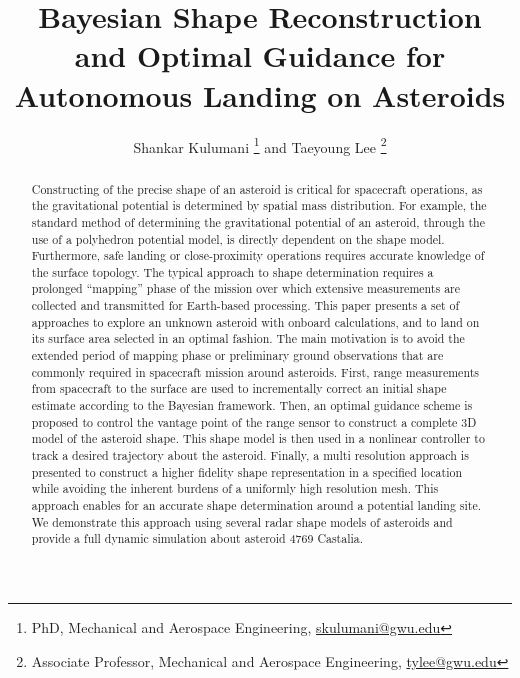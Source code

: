 \documentclass[journal]{new-aiaa}
\title{Bayesian Shape Reconstruction and Optimal Guidance for Autonomous Landing on Asteroids}
\author{Shankar Kulumani \footnote{PhD, Mechanical and Aerospace Engineering, \href{mailto:skulumani@gwu.edu}{skulumani@gwu.edu}}
and
Taeyoung Lee \footnote{Associate Professor, Mechanical and Aerospace Engineering, \href{mailto:tylee@gwu.edu}{tylee@gwu.edu}}}
\affil{The George Washington University, Washington, DC, 20052}
\begin{document}
\maketitle

\begin{abstract}
    Constructing of the precise shape of an asteroid is critical for spacecraft operations, as the gravitational potential is determined by spatial mass distribution.
    For example, the standard method of determining the gravitational potential of an asteroid, through the use of a polyhedron potential model, is directly dependent on the shape model.
    Furthermore, safe landing or close-proximity operations requires accurate knowledge of the surface topology. 
    The typical approach to shape determination requires a prolonged ``mapping'' phase of the mission over which extensive measurements are collected and transmitted for Earth-based processing.
    This paper presents a set of approaches to explore an unknown asteroid with onboard calculations, and to land on its surface area selected in an optimal fashion. 
    The main motivation is to avoid the extended period of mapping phase or preliminary ground observations that are commonly required in spacecraft mission around asteroids. 
    First, range measurements from spacecraft to the surface are used to incrementally correct an initial shape estimate according to the Bayesian framework. 
    Then, an optimal guidance scheme is proposed to control the vantage point of the range sensor to construct a complete 3D model of the asteroid shape. 
    This shape model is then used in a nonlinear controller to track a desired trajectory about the asteroid.
    Finally, a multi resolution approach is presented to construct a higher fidelity shape representation in a specified location while avoiding the inherent burdens of a uniformly high resolution mesh. 
    This approach enables for an accurate shape determination around a potential landing site.
    We demonstrate this approach using several radar shape models of asteroids and provide a full dynamic simulation about asteroid 4769 Castalia.
\end{abstract}

\end{document}
